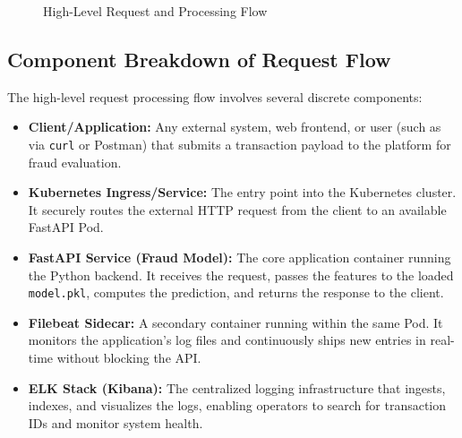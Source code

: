 \documentclass[12pt,a4paper]{article}
\begin{document}
\begin{figure}[H]
\centering
{}
\caption{High-Level Request and Processing Flow}
\end{figure}

\newpage

\subsection*{Component Breakdown of Request Flow}
The high-level request processing flow involves several discrete components:
\begin{itemize}
    \item \textbf{Client/Application:} Any external system, web frontend, or user (such as via \texttt{curl} or Postman) that submits a transaction payload to the platform for fraud evaluation.
    \item \textbf{Kubernetes Ingress/Service:} The entry point into the Kubernetes cluster. It securely routes the external HTTP request from the client to an available FastAPI Pod.
    \item \textbf{FastAPI Service (Fraud Model):} The core application container running the Python backend. It receives the request, passes the features to the loaded \texttt{model.pkl}, computes the prediction, and returns the response to the client.
    \item \textbf{Filebeat Sidecar:} A secondary container running within the same Pod. It monitors the application's log files and continuously ships new entries in real-time without blocking the API.
    \item \textbf{ELK Stack (Kibana):} The centralized logging infrastructure that ingests, indexes, and visualizes the logs, enabling operators to search for transaction IDs and monitor system health.
\end{itemize}
\end{document}
